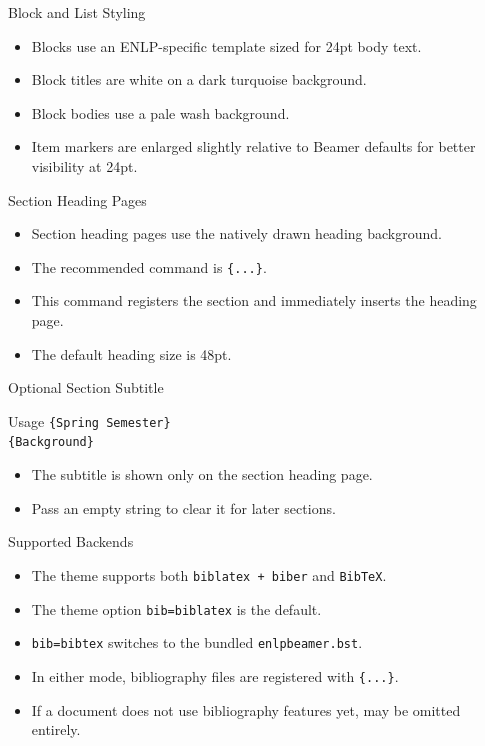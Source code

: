 \documentclass[10pt]{beamer}
\begin{document}
\begin{frame}{Block and List Styling}
  \begin{itemize}
    \item Blocks use an ENLP-specific template sized for 24pt body text.
    \item Block titles are white on a dark turquoise background.
    \item Block bodies use a pale wash background.
    \item Item markers are enlarged slightly relative to Beamer defaults for better visibility at 24pt.
  \end{itemize}
\end{frame}


\begin{frame}{Section Heading Pages}
  \begin{itemize}
    \item Section heading pages use the natively drawn heading background.
    \item The recommended command is \texttt{\string\enlpsectionframe\{...\}}.
    \item This command registers the section and immediately inserts the heading page.
    \item The default heading size is 48pt.
  \end{itemize}
\end{frame}

\begin{frame}{Optional Section Subtitle}
\begin{block}{Usage}
\texttt{\string\sectionpagesubtitle\{Spring Semester\}}\\
\texttt{\string\enlpsectionframe\{Background\}}
\end{block}
  \begin{itemize}
    \item The subtitle is shown only on the section heading page.
    \item Pass an empty string to clear it for later sections.
  \end{itemize}
\end{frame}


\begin{frame}{Supported Backends}
  \begin{itemize}
    \item The theme supports both \texttt{biblatex + biber} and \texttt{BibTeX}.
    \item The theme option \texttt{bib=biblatex} is the default.
    \item \texttt{bib=bibtex} switches to the bundled \texttt{enlpbeamer.bst}.
    \item In either mode, bibliography files are registered with \texttt{\string\enlpusebibresource\{...\}}.
    \item If a document does not use bibliography features yet, \texttt{\string\enlpusebibresource} may be omitted entirely.
  \end{itemize}
\end{frame}
\end{document}
